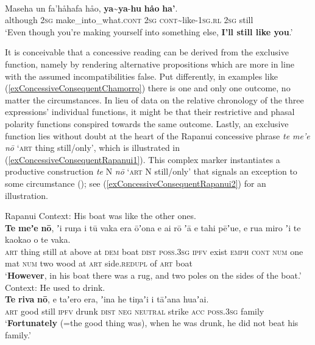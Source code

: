 \begin{exe}
	\ex {}\label{exConcessiveConsequentChamorro}\\
	\gll Maseha un fa’håhafa håo, \textbf{ya}\sim\textbf{ya}-\textbf{hu} \textbf{håo} \textbf{ha'}.\\
	although 2\textsc{sg} make\_into\_what.\textsc{cont} 2\textsc{sg} \textsc{cont}\sim{}like-1\textsc{sg}.\textsc{rl} 2\textsc{sg} still\\
	\glt \lq Even though you're making yourself into something else, \textbf{I'll still like you}.' \parencite[335]{Chung2020}
\end{exe}

It is conceivable that a concessive reading can be derived from the exclusive function, namely by rendering alternative propositions which are more in line with the assumed incompatibilities false. Put differently, in examples like (\ref{exConcessiveConsequentChamorro}) there is one and only one outcome, no matter the circumstances. In lieu of data on the relative chronology of the three expressions' individual functions, it might be that their restrictive and phasal polarity functions conspired towards the same outcome. Lastly, an exclusive function lies without doubt at the heart of the Rapanui concessive phrase \textit{te me'e nō} \lq \textsc{art} thing still/only\rq{}, which is illustrated in (\ref{exConcessiveConsequentRapanui1}). This complex marker instantiates a productive construction \textit{te} N \textit{nō} \lq \textsc{art} N still/only\rq{ }that signals an exception to some circumstance (\cite[266–268, 570]{Kieviet2017}); see (\ref{exConcessiveConsequentRapanui2}) for an illustration.

\begin{exe}
	\ex 
	\begin{xlist}
		\exi{}Rapanui
		\ex Context: His boat was like the other ones.\label{exConcessiveConsequentRapanui1}\\
		\gll \textbf{Te} \textbf{meʼe} \textbf{nō}, ʼi ruŋa i tū vaka era ōʼona e ai rō ʼā e tahi pēʼue, e rua miro ʼi te kaokao o te vaka.\\
	\textsc{art} thing still at above at \textsc{dem} boat \textsc{dist} \textsc{poss}.3\textsc{sg} \textsc{ipfv} exist 	\textsc{emph} \textsc{cont} \textsc{num} one mat \textsc{num} two wood at \textsc{art} side.\textsc{redupl} of \textsc{art} boat\\
	\glt \lq \textbf{However}, in his boat there was a rug, and two poles on the sides of the boat.' \parencite[268]{Kieviet2017}
	\ex \label{exConcessiveConsequentRapanui2}
	Context: He used to drink.\\
		\gll \textbf{Te} \textbf{riva} \textbf{nō}, e taʼero era, ʼina he tiŋaʼi i tāʼana huaʼai.\\
	\textsc{art} good still \textsc{ipfv} drunk \textsc{dist} \textsc{neg} \textsc{neutral} strike \textsc{acc} \textsc{poss}.3\textsc{sg} family\\
		\glt \lq \textbf{Fortunately} (=the good thing was), when he was drunk, he did not beat his family.' \parencite[268]{Kieviet2017}
	\end{xlist}
\end{exe}

